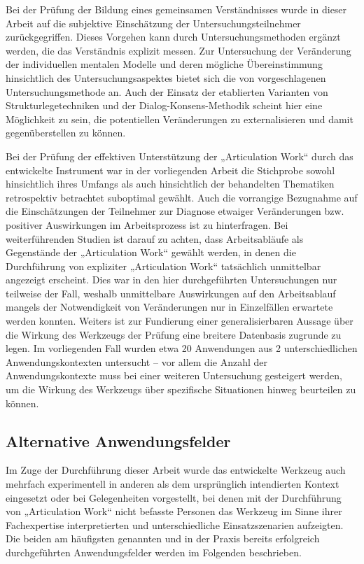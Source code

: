 Bei der Prüfung der Bildung eines gemeinsamen Verständnisses wurde in dieser Arbeit auf die subjektive Einschätzung der Untersuchungsteilnehmer zurückgegriffen. Dieses Vorgehen kann durch Untersuchungsmethoden ergänzt werden, die das Verständnis explizit messen. Zur Untersuchung der Veränderung der individuellen mentalen Modelle und deren mögliche Übereinstimmung hinsichtlich des Untersuchungsaspektes bietet sich die von \citep{Ifenthaler06} vorgeschlagenen Untersuchungsmethode an. Auch der Einsatz der etablierten Varianten von Strukturlegetechniken und der Dialog-Konsens-Methodik scheint hier eine Möglichkeit zu sein, die potentiellen Veränderungen zu externalisieren und damit gegenüberstellen zu können.

Bei der Prüfung der effektiven Unterstützung der „Articulation Work“ durch das entwickelte Instrument war in der vorliegenden Arbeit die Stichprobe sowohl hinsichtlich ihres Umfangs als auch hinsichtlich der behandelten Thematiken retrospektiv betrachtet suboptimal gewählt. Auch die vorrangige Bezugnahme auf die Einschätzungen der Teilnehmer zur Diagnose etwaiger Veränderungen bzw. positiver Auswirkungen im Arbeitsprozess ist zu hinterfragen. Bei weiterführenden Studien ist darauf zu achten, dass Arbeitsabläufe als Gegenstände der „Articulation Work“ gewählt werden, in denen die Durchführung von expliziter „Articulation Work“ tatsächlich unmittelbar angezeigt erscheint. Dies war in den hier durchgeführten Untersuchungen nur teilweise der Fall, weshalb unmittelbare Auswirkungen auf den Arbeitsablauf mangels der Notwendigkeit von Veränderungen nur in Einzelfällen erwartete werden konnten. Weiters ist zur Fundierung einer generalisierbaren Aussage über die Wirkung des Werkzeugs der Prüfung eine breitere Datenbasis zugrunde zu legen. Im vorliegenden Fall wurden etwa 20 Anwendungen aus 2 unterschiedlichen Anwendungskontexten untersucht -- vor allem die Anzahl der Anwendungskontexte muss bei einer weiteren Untersuchung gesteigert werden, um die Wirkung des Werkzeugs über spezifische Situationen hinweg beurteilen zu können.


\subsection{Alternative Anwendungsfelder} %
\label{sub:alternative_anwendungsfelder}

Im Zuge der Durchführung dieser Arbeit wurde das entwickelte Werkzeug auch mehrfach experimentell in anderen als dem ursprünglich intendierten Kontext eingesetzt oder bei Gelegenheiten vorgestellt, bei denen mit der Durchführung von „Articulation Work“ nicht befasste Personen das Werkzeug im Sinne ihrer Fachexpertise interpretierten und unterschiedliche Einsatzszenarien aufzeigten. Die beiden am häufigsten genannten und in der Praxis bereits erfolgreich durchgeführten Anwendungsfelder werden im Folgenden beschrieben.


